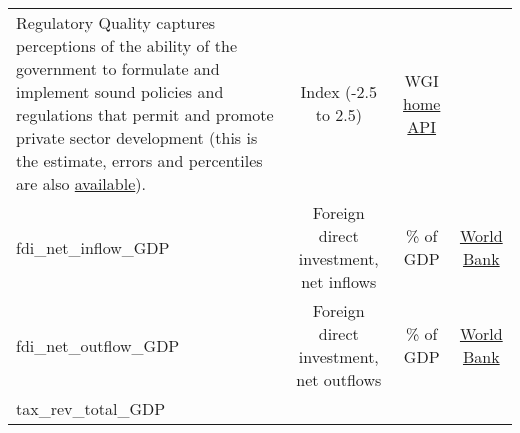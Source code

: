 \documentclass[]{article}
\begin{document}
\begin{longtable}[]{@{}lccc@{}}
\begin{minipage}[t]{0.36\columnwidth}
Regulatory Quality captures perceptions of the ability of the government
to formulate and implement sound policies and regulations that permit
and promote private sector development (this is the estimate, errors and
percentiles are also
\href{https://info.worldbank.org/governance/wgi/\#home}{available}).\strut
\end{minipage} & \begin{minipage}[t]{0.24\columnwidth}\centering\strut
Index (-2.5 to 2.5)\strut
\end{minipage} & \begin{minipage}[t]{0.15\columnwidth}\centering\strut
WGI \href{https://info.worldbank.org/governance/wgi/\#home}{home}
\href{https://api.worldbank.org/v2/sources/3/indicators}{API}\strut
\end{minipage}\tabularnewline
\begin{minipage}[t]{0.14\columnwidth}\raggedright\strut
fdi\_net\_inflow\_GDP\strut
\end{minipage} & \begin{minipage}[t]{0.36\columnwidth}\centering\strut
Foreign direct investment, net inflows\strut
\end{minipage} & \begin{minipage}[t]{0.24\columnwidth}\centering\strut
\% of GDP\strut
\end{minipage} & \begin{minipage}[t]{0.15\columnwidth}\centering\strut
\href{https://data.worldbank.org/indicator/BX.KLT.DINV.WD.GD.ZS}{World
Bank}\strut
\end{minipage}\tabularnewline
\begin{minipage}[t]{0.14\columnwidth}\raggedright\strut
fdi\_net\_outflow\_GDP\strut
\end{minipage} & \begin{minipage}[t]{0.36\columnwidth}\centering\strut
Foreign direct investment, net outflows\strut
\end{minipage} & \begin{minipage}[t]{0.24\columnwidth}\centering\strut
\% of GDP\strut
\end{minipage} & \begin{minipage}[t]{0.15\columnwidth}\centering\strut
\href{https://data.worldbank.org/indicator/BM.KLT.DINV.WD.GD.ZS}{World
Bank}\strut
\end{minipage}\tabularnewline
\begin{minipage}[t]{0.14\columnwidth}\raggedright\strut
tax\_rev\_total\_GDP\strut
\end{minipage} & \begin{minipage}[t]{0.36\columnwidth}\centering\strut

\end{minipage}
\end{longtable}
\end{document}

